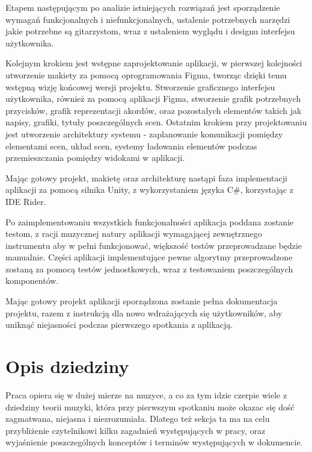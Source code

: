 Etapem następującym po analizie istniejących rozwiązań jest sporządzenie wymagań funkcjonalnych i niefunkcjonalnych, ustalenie potrzebnych narzędzi jakie potrzebne są gitarzystom, wraz z ustaleniem wyglądu i designu interfejsu użytkownika.

Kolejnym krokiem jest wstępne zaprojektowanie aplikacji, w pierwszej kolejności utworzenie makiety za pomocą oprogramowania Figma, tworząc dzięki temu wstępną wizję końcowej wersji projektu. Stworzenie graficznego interfejsu użytkownika, również za pomocą aplikacji Figma, stworzenie grafik potrzebnych przycisków, grafik reprezentacji akordów, oraz pozostałych elementów takich jak napisy, grafiki, tytuły poszczególnych scen. Ostatnim krokiem przy projektowaniu jest utworzenie architektury systemu - zaplanowanie komunikacji pomiędzy elementami scen, układ scen, systemy ładowania elementów podczas przemieszczania pomiędzy widokami w aplikacji. 

Mając gotowy projekt, makietę oraz architekturę nastąpi faza implementacji aplikacji za pomocą silnika Unity, z wykorzystaniem języka C\#, korzystając z IDE Rider.

Po zaimplementowaniu wszystkich funkcjonalności aplikacja poddana zostanie testom, z racji muzycznej natury aplikacji wymagającej zewnętrznego instrumentu aby w pełni funkcjonować, większość testów przeprowadzane będzie manualnie. Części aplikacji implementujące pewne algorytmy przeprowadzone zostaną za pomocą testów jednostkowych, wraz z testowaniem poszczególnych komponentów.  

Mając gotowy projekt aplikacji sporządzona zostanie pełna dokumentacja projektu, razem z instrukcją dla nowo wdrażających się użytkowników, aby uniknąć niejasności podczas pierwszego spotkania z aplikacją. 


\section{Opis dziedziny}

Praca opiera się w dużej mierze na muzyce, a co za tym idzie czerpie wiele z dziedziny teorii muzyki, która przy pierwszym spotkaniu może okazac się dość zagmatwana, niejasna i niezrozumiała. Dlatego też sekcja ta ma na celu przybliżenie czytelnikowi kilku zagadnień występujących w pracy, oraz wyjaśnienie poszczególnych konceptów i terminów występujących w dokumencie. 

